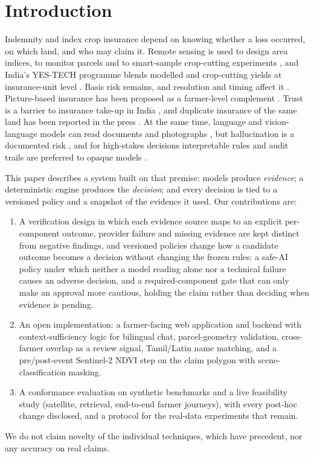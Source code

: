 \documentclass[journal]{IEEEtran}
\begin{document}
\section{Introduction}
Indemnity and index crop insurance depend on knowing whether a loss occurred, on which land, and who may claim it. Remote sensing is used to design area indices, to monitor parcels and to smart-sample crop-cutting experiments \cite{okeyo2020,sitokonstantinou2018,murthy2019smart}, and India's YES-TECH programme blends modelled and crop-cutting yields at insurance-unit level \cite{mncfc2023yestech}. Basis risk remains, and resolution and timing affect it \cite{kolle2021,dalhaus2016,carter2017}. Picture-based insurance has been proposed as a farmer-level complement \cite{ceballos2019}. Trust is a barrier to insurance take-up in India \cite{cole2013}, and duplicate insurance of the same land has been reported in the press \cite{tribune2023cotton}. At the same time, language and vision-language models can read documents and photographs \cite{gemini2023,kim2022}, but hallucination is a documented risk \cite{ji2023}, and for high-stakes decisions interpretable rules and audit trails are preferred to opaque models \cite{rudin2019,raji2020}.

This paper describes a system built on that premise: models produce \emph{evidence}; a deterministic engine produces the \emph{decision}; and every decision is tied to a versioned policy and a snapshot of the evidence it used. Our contributions are:
\begin{enumerate}
\item A verification design in which each evidence source maps to an explicit per-component outcome, provider failure and missing evidence are kept distinct from negative findings, and versioned policies change how a candidate outcome becomes a decision without changing the frozen rules: a safe-AI policy under which neither a model reading alone nor a technical failure causes an adverse decision, and a required-component gate that can only make an approval more cautious, holding the claim rather than deciding when evidence is pending.
\item An open implementation: a farmer-facing web application and backend with context-sufficiency logic for bilingual chat, parcel-geometry validation, cross-farmer overlap as a review signal, Tamil/Latin name matching, and a pre/post-event Sentinel-2 NDVI step on the claim polygon with scene-classification masking.
\item A conformance evaluation on synthetic benchmarks and a live feasibility study (satellite, retrieval, end-to-end farmer journeys), with every post-hoc change disclosed, and a protocol for the real-data experiments that remain.
\end{enumerate}
We do not claim novelty of the individual techniques, which have precedent, nor any accuracy on real claims.
\end{document}
